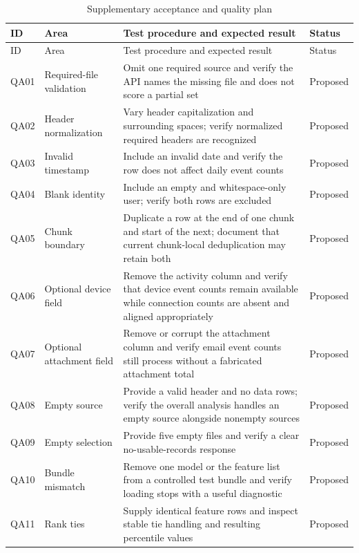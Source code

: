 \begin{longtable}{|p{}|p{}|p{}|p{}|}
\caption{Supplementary acceptance and quality plan}\label{tab:supplementary-qa}\\
\hline
ID & Area & Test procedure and expected result & Status\\
\hline
\endfirsthead
\hline
ID & Area & Test procedure and expected result & Status\\
\hline
\endhead
QA01 & Required-file validation & Omit one required source and verify the API names the missing file and does not score a partial set & Proposed\\
\hline
QA02 & Header normalization & Vary header capitalization and surrounding spaces; verify normalized required headers are recognized & Proposed\\
\hline
QA03 & Invalid timestamp & Include an invalid date and verify the row does not affect daily event counts & Proposed\\
\hline
QA04 & Blank identity & Include an empty and whitespace-only user; verify both rows are excluded & Proposed\\
\hline
QA05 & Chunk boundary & Duplicate a row at the end of one chunk and start of the next; document that current chunk-local deduplication may retain both & Proposed\\
\hline
QA06 & Optional device field & Remove the activity column and verify that device event counts remain available while connection counts are absent and aligned appropriately & Proposed\\
\hline
QA07 & Optional attachment field & Remove or corrupt the attachment column and verify email event counts still process without a fabricated attachment total & Proposed\\
\hline
QA08 & Empty source & Provide a valid header and no data rows; verify the overall analysis handles an empty source alongside nonempty sources & Proposed\\
\hline
QA09 & Empty selection & Provide five empty files and verify a clear no-usable-records response & Proposed\\
\hline
QA10 & Bundle mismatch & Remove one model or the feature list from a controlled test bundle and verify loading stops with a useful diagnostic & Proposed\\
\hline
QA11 & Rank ties & Supply identical feature rows and inspect stable tie handling and resulting percentile values & Proposed\\
\hline

\end{longtable}
